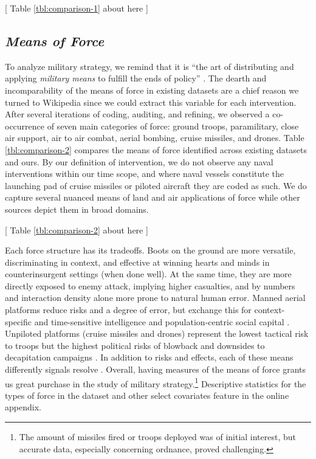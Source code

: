 \documentclass[fleqn,12pt]{article}
\begin{document}
\begin{center}
	[ Table \ref{tbl:comparison-1} about here ]
\end{center}

\subsection*{\textit{Means of Force}}
To analyze military strategy, we remind that it is ``the art of distributing and applying \textit{military means} to fulfill the ends of policy” \citep[][335]{Hart62}. The dearth and incomparability of the means of force in existing datasets are a chief reason we turned to Wikipedia since we could extract this variable for each intervention. After several iterations of coding, auditing, and refining, we observed a co-occurrence of seven main categories of force: ground troops, paramilitary, close air support, air to air combat, aerial bombing, cruise missiles, and drones. Table \ref{tbl:comparison-2} compares the means of force identified across existing datasets and ours. By our definition of intervention, we do not observe any naval interventions within our time scope, and where naval vessels constitute the launching pad of cruise missiles or piloted aircraft they are coded as such. We do capture several nuanced means of land and air applications of force while other sources depict them in broad domains.

\begin{center}
	[ Table \ref{tbl:comparison-2} about here ]
\end{center}

Each force structure has its tradeoffs. Boots on the ground are more versatile, discriminating in context, and effective at winning hearts and minds in counterinsurgent settings (when done well). At the same time, they are more directly exposed to enemy attack, implying higher casualties, and by numbers and interaction density alone more prone to natural human error. Manned aerial platforms reduce risks and a degree of error, but exchange this for context-specific and time-sensitive intelligence and population-centric social capital \citep{LyallWilson09}. Unpiloted platforms (cruise missiles and drones) represent the lowest tactical risk to troops but the highest political risks of blowback \citep{JohnstonSarbahi16} and downsides to decapitation campaigns \citep{Price12}. In addition to risks and effects, each of these means differently signals resolve \citep{Zegart18}. Overall, having measures of the means of force grants us great purchase in the study of military strategy.\footnote{The amount of missiles fired or troops deployed was of initial interest, but accurate data, especially concerning ordnance, proved challenging.} Descriptive statistics for the types of force in the dataset and other select covariates feature in the online appendix.
\end{document}
